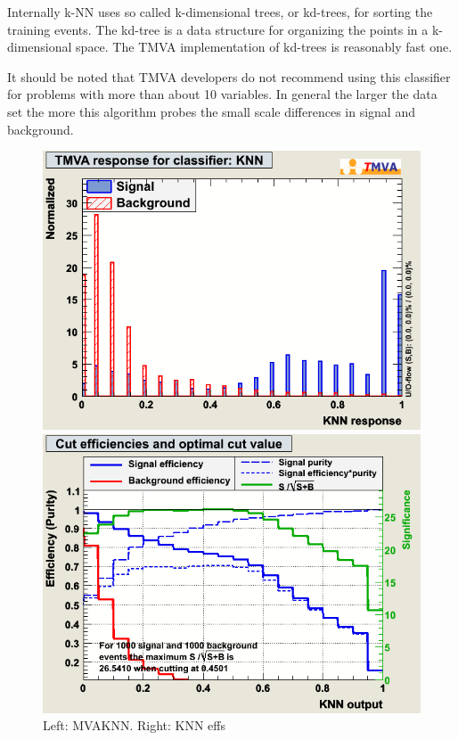 Internally k-NN uses so called k-dimensional trees, or kd-trees, for
sorting the training events. The kd-tree is a data structure for
organizing the points in a k-dimensional space. The TMVA
implementation of kd-trees is reasonably fast one.

It should be noted that TMVA developers do not recommend using this
classifier for problems with more than about 10 variables. In general
the larger the data set the more this algorithm probes the small scale
differences in signal and background.

\begin{figure}[h]
 \begin{minipage}{8.5cm}
\includegraphics[width=1.0\textwidth]{images/pkMva_KNN.png}
\end{minipage}
 \hfill
\begin{minipage}{8.5cm}
\includegraphics[width=1.0\textwidth]{images/pkMvaEffs_KNN.png}
\end{minipage}
\caption{Left: MVAKNN. Right: KNN effs}
\label{fig:pkMvaKNN}
\end{figure}


